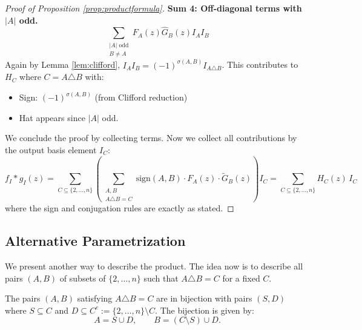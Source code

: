 \documentclass[11pt]{amsart}
\begin{document}
\begin{proof}[Proof of Proposition \ref{prop:productformula}]
\textbf{Sum 4: Off-diagonal terms with $|A|$ odd.}
\[
\sum_{\substack{|A| \text{ odd} \\ B \neq A}} F_A(z) \hat{G}_B(z) I_A I_B
\]
Again by Lemma \ref{lem:clifford}, $I_A I_B = (-1)^{\sigma(A,B)} I_{A \triangle B}$.  This contributes to $H_C$ where $C = A \triangle B$ with:
\begin{itemize}
    \item Sign: $(-1)^{\sigma(A,B)}$ (from Clifford reduction)
    \item Hat appears since $|A|$ odd.
\end{itemize}

We conclude the proof by collecting terms.  Now we collect all contributions by the output basis element $I_C$:
\[
f_I * g_I(z) = \sum_{C \subseteq \{2,\ldots,n\}} \left( \sum_{\substack{A, B \\ A \triangle B = C}} \mathrm{sign}(A,B) \cdot F_A(z) \cdot \tilde{G}_B(z) \right) I_C = \sum_{C \subseteq \{2,\ldots,n\}} H_C(z) \, I_C
\]
where the sign and conjugation rules are exactly as stated.
\end{proof}



\subsection{Alternative Parametrization}

We present another way to describe the product.  The idea now is to describe all pairs $(A, B)$ of subsets of $\{2, \ldots, n\}$ such that $A \triangle B = C$ for a fixed $C$.

\begin{prop}
The pairs $(A, B)$ satisfying $A \triangle B = C$ are in bijection with pairs $(S, D)$ where $S \subseteq C$ and $D \subseteq C^c := \{2, \ldots, n\} \setminus C$. The bijection is given by:
\[
A = S \cup D, \qquad B = (C \setminus S) \cup D.
\]
\end{prop}
\end{document}
